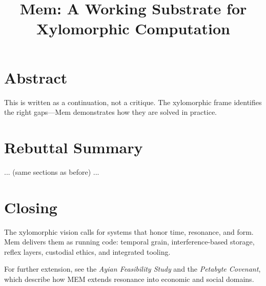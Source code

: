 \documentclass[12pt]{article}
\title{Mem\textbar8: A Working Substrate for Xylomorphic Computation}
\author{}
\date{}
\begin{document}
\maketitle

\section*{Abstract}
This is written as a continuation, not a critique. The xylomorphic frame identifies the right gaps---Mem demonstrates how they are solved in practice.

\section{Rebuttal Summary}
... (same sections as before) ...

\section*{Closing}
The xylomorphic vision calls for systems that honor time, resonance, and form. Mem delivers them as running code: temporal grain, interference-based storage, reflex layers, custodial ethics, and integrated tooling.

For further extension, see the \textit{Ayian Feasibility Study} and the \textit{Petabyte Covenant}, which describe how MEM extends resonance into economic and social domains.
\end{document}

